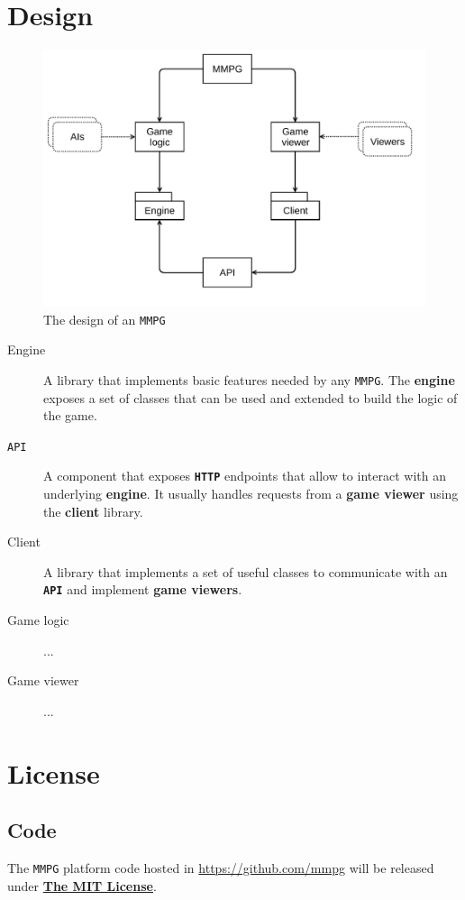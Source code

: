 \documentclass[a4paper,11pt,titlepage,abstract,numbers=noenddot,automark,mnsy,intlimits,rgb,dvipsnames]{report}
\begin{document}
\chapter{Design}
\label{design}
\begin{figure}[H]
\begin{center}
\includegraphics[scale=0.5]{graphs/mmpg_design.pdf}
\end{center}
\caption{The design of an \texttt{MMPG}}
\label{mmpg_graph}
\end{figure}
\begin{description}
\item[Engine]
A library that implements basic features needed by any \texttt{MMPG}. The \textbf{engine} exposes a set
  of classes that can be used and extended to build the logic of the game.
\item[\texttt{API}]
A component that exposes \textbf{\texttt{HTTP}} endpoints that allow to interact with an underlying \textbf{engine}. It
  usually handles requests from a \textbf{game viewer} using the \textbf{client} library.
\item[Client]
A library that implements a set of useful classes to communicate with an \textbf{\texttt{API}} and implement
  \textbf{game viewers}.
\item[Game logic]
...
\item[Game viewer]
...
\end{description}
\clearpage
\chapter{License}
\section{Code}
The \texttt{MMPG} platform code hosted in \url{https://github.com/mmpg} will be released under
\href{https://opensource.org/licenses/MIT}{\textbf{The MIT License}}.
\end{document}
